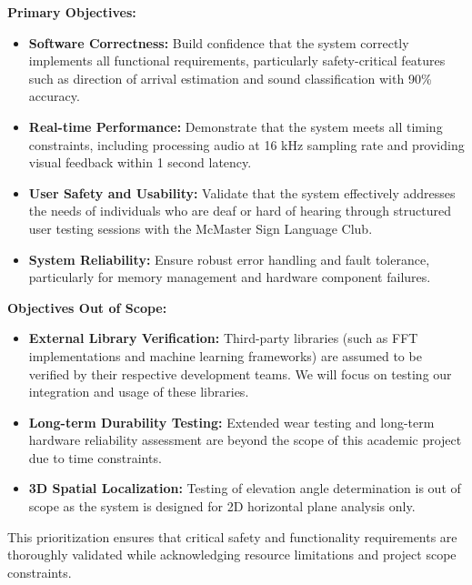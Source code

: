 \documentclass[12pt, titlepage]{article}
\begin{document}
\textbf{Primary Objectives:}
\begin{itemize}
    \item \textbf{Software Correctness:} Build confidence that the system
    correctly implements all functional requirements, particularly
    safety-critical features such as direction of arrival estimation and sound
    classification with 90\% accuracy.
    
    \item \textbf{Real-time Performance:} Demonstrate that the system meets all
    timing constraints, including processing audio at 16 kHz sampling rate and
    providing visual feedback within 1 second latency.
    
    \item \textbf{User Safety and Usability:} Validate that the system
    effectively addresses the needs of individuals who are deaf or hard of
    hearing through structured user testing sessions with the McMaster Sign
    Language Club.
    
    \item \textbf{System Reliability:} Ensure robust error handling and fault
    tolerance, particularly for memory management and hardware component
    failures.
\end{itemize}

\textbf{Objectives Out of Scope:}
\begin{itemize}
    \item \textbf{External Library Verification:} Third-party libraries (such as
    FFT implementations and machine learning frameworks) are assumed to be
    verified by their respective development teams. We will focus on testing our
    integration and usage of these libraries.
    
    \item \textbf{Long-term Durability Testing:} Extended wear testing and
    long-term hardware reliability assessment are beyond the scope of this
    academic project due to time constraints.
        
    \item \textbf{3D Spatial Localization:} Testing of elevation angle
    determination is out of scope as the system is designed for 2D horizontal
    plane analysis only.
\end{itemize}

This prioritization ensures that critical safety and functionality requirements
are thoroughly validated while acknowledging resource limitations and project
scope constraints.
\end{document}
